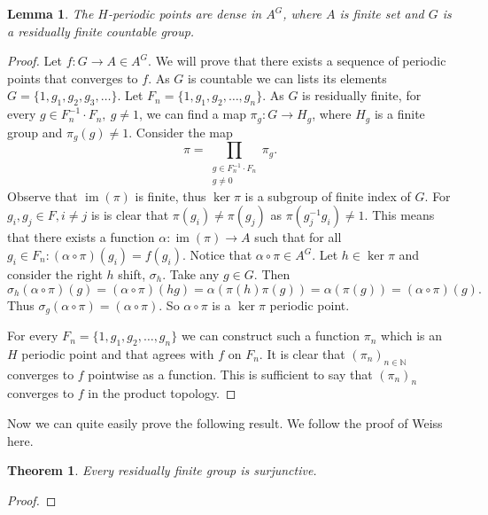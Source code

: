 \documentclass[titlepage, a4paper]{article}
\newcommand{\N}{\mathbb{N}}
\DeclareMathOperator{\im}{im}
\newtheorem{theorem}{Theorem}
\newtheorem{lemma}{Lemma}
\theoremstyle{remark}
\begin{document}
    \begin{lemma} \label{lem:h-periodic_points}
    The $H$-periodic points are dense in $A^G$, where $A$ is finite set and $G$ is a residually finite countable group.
    \end{lemma}
    \begin{proof}
        Let $f:G \to A \in A^G$. We will prove that there exists a sequence of periodic points that converges to $f$. As $G$ is countable we can lists its elements $G = \{1, g_1, g_2, g_3,\dots\}$. 
        Let $F_n = \{1, g_1, g_2, \dots, g_n\}$. 
        As $G$ is residually finite, for every $g \in F_n^{-1} \cdot F_n,\ g \ne 1$, we can find a map $\pi_g: G \to H_g$, where $H_g$ is a finite group and $\pi_g(g) \ne 1$.  Consider the map \[\pi = \prod_{ \substack{g\in  F_n^{-1} \cdot F_n\\ g\ne 0}} \pi_g
        .\]
        Observe that $\im(\pi)$ is finite, thus $\ker\pi$ is a subgroup of finite index of $G$. 
        For $g_i, g_j \in F, i \ne j$ is is clear that $\pi(g_i) \ne \pi(g_j)$ as $\pi(g_j^{-1} g_i) \ne 1$. 
        This means that there exists a function $\alpha: \im(\pi) \to A$ such that for all $g_i \in F_n: (\alpha \circ \pi)(g_i) = f(g_i)$. 
        Notice that $\alpha \circ \pi \in A^G$. 
        Let $h \in \ker\pi$ and consider the right $h$ shift, $\sigma_h$. 
        Take any $g \in G$. 
        Then 
        \[\sigma_h(\alpha\circ\pi)(g) = (\alpha \circ \pi)(hg) = \alpha(\pi(h)\pi(g)) = \alpha(\pi(g)) = (\alpha\circ\pi)(g).\] Thus $\sigma_g(\alpha \circ \pi) = (\alpha\circ\pi)$.
        So $\alpha\circ\pi$ is a $\ker\pi$ periodic point. 

        For every $F_n =  \{1, g_1, g_2, \dots, g_n\}$ we can construct such a function $\pi_n$ which is an $H$ periodic point and that agrees with $f$ on $F_n$. It is clear that $(\pi_n)_{n\in\N}$ converges to $f$ pointwise as a function. This is sufficient to say that $(\pi_n)_n$ converges to $f$ in the product topology.
    \end{proof}

    Now we can quite easily prove the following result. We follow the proof of Weiss \cite{weiss_2000} here.
    \begin{theorem} \label{thm:res_fin_surjunctive}
    Every residually finite group is surjunctive.
    \end{theorem}
    \begin{proof}
    
    \end{proof}
\end{document}
